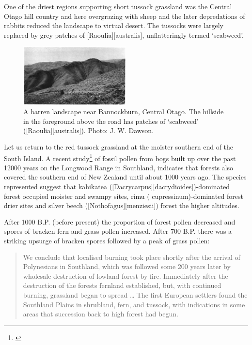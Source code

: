 One of the driest regions supporting short tussock grassland was the Central Otago hill country and here overgrazing with sheep and the later depredations of rabbits reduced the landscape to virtual desert.
The tussocks were largely replaced by grey patches of [Raoulia][australis], unflatteringly termed `scabweed'.

\begin{figure}
	\includegraphics[width=0.5\textwidth]{graphics/figure86barren.jpg}
	\centering
	\caption[A barren landscape near Bannockburn]{A barren landscape near Bannockburn, Central Otago.
	The hillside in the foreground above the road has patches of `scabweed' ([Raoulia][australis]).
	Photo:  J. W. Dawson.}%
	\label{fig:86barren}
\end{figure}

Let us return to the red tussock grassland at the moister southern end of the South Island.
A recent study\footnote{\cite{mcglone1983vegetation}} of fossil pollen from bogs built up over the past 12000 years on the Longwood Range in Southland, indicates that forests also covered the southern end of New Zealand until about 1000 years ago.
The species represented suggest that kahikatea ([Dacrycarpus][dacrydioides])-dominated forest occupied moister and swampy sites, rimu ( cupressinum)-dominated forest drier sites and silver beech ([Nothofagus][menziesii]) forest the higher altitudes.

After 1000 B.P. (before present) the proportion of forest pollen decreased and spores of bracken fern and grass pollen increased.
After 700 B.P. there was a striking upsurge of bracken spores followed by a peak of grass pollen:

\begin{quote}
	We conclude that localised burning took place shortly after the arrival of Polynesians in Southland, which was followed some 200 years later by wholesale destruction of lowland forest by fire.
	Immediately after the destruction of the forests fernland established, but, with continued burning, grassland began to spread … The first European settlers found the Southland Plains in shrubland, fern, and tussock, with indications in some areas that succession back to high forest had begun.
\end{quote}

